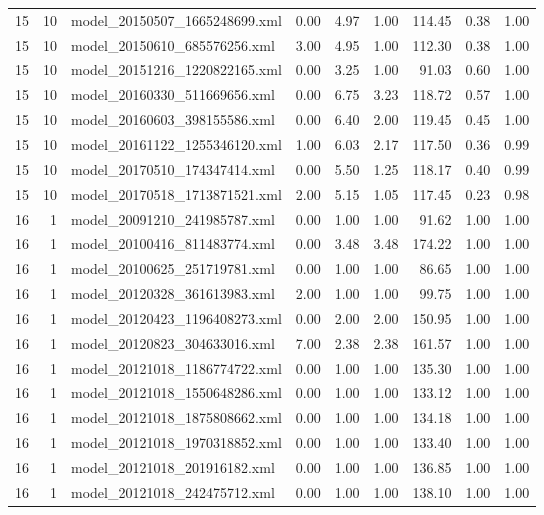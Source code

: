 \begin{table}[ht]
\begin{tabular}{rrlrrrrrr}
   15 &  10 & model\_20150507\_1665248699.xml & 0.00 & 4.97 & 1.00 & 114.45 & 0.38 & 1.00 \\ 
   15 &  10 & model\_20150610\_685576256.xml & 3.00 & 4.95 & 1.00 & 112.30 & 0.38 & 1.00 \\ 
   15 &  10 & model\_20151216\_1220822165.xml & 0.00 & 3.25 & 1.00 & 91.03 & 0.60 & 1.00 \\ 
   15 &  10 & model\_20160330\_511669656.xml & 0.00 & 6.75 & 3.23 & 118.72 & 0.57 & 1.00 \\ 
   15 &  10 & model\_20160603\_398155586.xml & 0.00 & 6.40 & 2.00 & 119.45 & 0.45 & 1.00 \\ 
   15 &  10 & model\_20161122\_1255346120.xml & 1.00 & 6.03 & 2.17 & 117.50 & 0.36 & 0.99 \\ 
   15 &  10 & model\_20170510\_174347414.xml & 0.00 & 5.50 & 1.25 & 118.17 & 0.40 & 0.99 \\ 
   15 &  10 & model\_20170518\_1713871521.xml & 2.00 & 5.15 & 1.05 & 117.45 & 0.23 & 0.98 \\ 
   16 &   1 & model\_20091210\_241985787.xml & 0.00 & 1.00 & 1.00 & 91.62 & 1.00 & 1.00 \\ 
   16 &   1 & model\_20100416\_811483774.xml & 0.00 & 3.48 & 3.48 & 174.22 & 1.00 & 1.00 \\ 
   16 &   1 & model\_20100625\_251719781.xml & 0.00 & 1.00 & 1.00 & 86.65 & 1.00 & 1.00 \\ 
   16 &   1 & model\_20120328\_361613983.xml & 2.00 & 1.00 & 1.00 & 99.75 & 1.00 & 1.00 \\ 
   16 &   1 & model\_20120423\_1196408273.xml & 0.00 & 2.00 & 2.00 & 150.95 & 1.00 & 1.00 \\ 
   16 &   1 & model\_20120823\_304633016.xml & 7.00 & 2.38 & 2.38 & 161.57 & 1.00 & 1.00 \\ 
   16 &   1 & model\_20121018\_1186774722.xml & 0.00 & 1.00 & 1.00 & 135.30 & 1.00 & 1.00 \\ 
   16 &   1 & model\_20121018\_1550648286.xml & 0.00 & 1.00 & 1.00 & 133.12 & 1.00 & 1.00 \\ 
   16 &   1 & model\_20121018\_1875808662.xml & 0.00 & 1.00 & 1.00 & 134.18 & 1.00 & 1.00 \\ 
   16 &   1 & model\_20121018\_1970318852.xml & 0.00 & 1.00 & 1.00 & 133.40 & 1.00 & 1.00 \\ 
   16 &   1 & model\_20121018\_201916182.xml & 0.00 & 1.00 & 1.00 & 136.85 & 1.00 & 1.00 \\ 
   16 &   1 & model\_20121018\_242475712.xml & 0.00 & 1.00 & 1.00 & 138.10 & 1.00 & 1.00 \\ 

\end{tabular}
\end{table}
